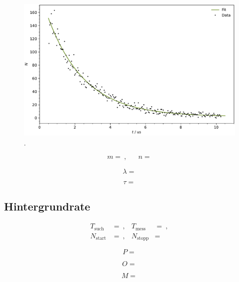 \begin{figure}[H]
	\centering
	\includegraphics[width=\textwidth]{build/lifetime.pdf}
	\caption{.}
	\label{fig:lifetime}
\end{figure}

\begin{align*}
	m =  \: , && n = 
\end{align*}

\begin{equation*}
	\lambda = 
\end{equation*}

\begin{equation*}
	\tau = 
\end{equation*}



\subsection{Hintergrundrate}

\begin{align*}
	T_\text{such} &=  \: , & T_\text{mess} &=  \: , \\
	N_\text{start} &=  \: , & N_\text{stopp} &= 
\end{align*}

\begin{equation*}
	P = 
\end{equation*}

\begin{equation*}
	O = 
\end{equation*}



\begin{equation*}
	M = 
\end{equation*}
